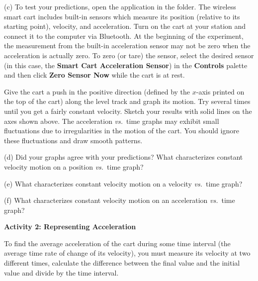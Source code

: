 
(c) To test your predictions, open the  application in the \filename{\coursefolder} folder. The wireless smart cart includes built-in sensors which measure its position (relative to its starting point), velocity, and acceleration. Turn on the cart at your station and connect it to the computer via Bluetooth. At the beginning of the experiment, the measurement from the built-in acceleration sensor may not be zero when the acceleration is actually zero. To zero (or tare) the sensor, select the desired sensor (in this case, the \textbf{Smart Cart Acceleration Sensor}) in the \textbf{Controls} palette and then click \textbf{Zero Sensor Now} while the cart is at rest. 

Give the cart a push in the positive direction (defined by the $x$-axis printed on the top of the cart) along the level track and graph its motion. Try several times until you get a fairly constant velocity. Sketch your results with solid lines on the axes shown above. The acceleration \textit{vs.}~time graphs may exhibit small fluctuations due to irregularities in the motion of the cart. You should ignore these fluctuations and draw smooth
patterns.
\answerspace{0.2in}

\pagebreak[2]
(d) Did your graphs agree with your predictions? What characterizes constant
velocity motion on a position \textit{vs.}~time graph? 
\answerspace{10mm}

(e) What characterizes constant velocity motion on a velocity \textit{vs.}~time graph?
\answerspace{10mm}

(f) What characterizes constant velocity motion on an acceleration \textit{vs.}~time graph?
\answerspace{10mm}

\textbf{Activity 2: Representing Acceleration} 

To find the average acceleration of the cart during some time interval (the
average time rate of change of its velocity), you must measure its velocity
at two different times, calculate the difference between the final value and
the initial value and divide by the time interval.

